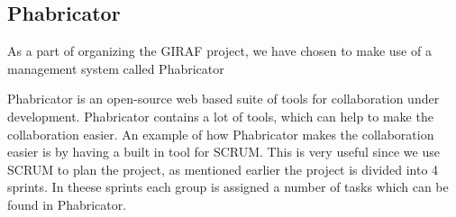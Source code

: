 \subsection{Phabricator}
As a part of organizing the GIRAF project, we have chosen to make use of a
management system called Phabricator\nl

Phabricator is an open-source web based suite of tools for collaboration under
development. Phabricator contains a lot of tools, which can help to make the
collaboration easier. An example of how Phabricator makes the collaboration
easier is by having a built in tool for SCRUM. This is very useful since we use
SCRUM to plan the project, as mentioned earlier the project is divided into 4
sprints. In theese sprints each group is assigned a number of tasks which can be
found in Phabricator. \cite{phabricator}